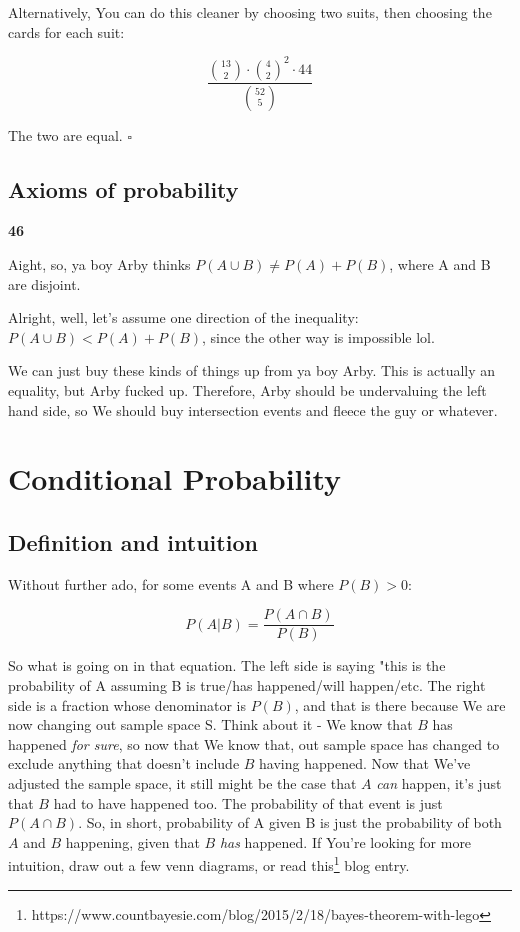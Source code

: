 \documentclass{article}
\newcommand{\qed}{\hfill$\square$}
\begin{document}
			Alternatively, You can do this cleaner by choosing two suits, then choosing the cards for each suit:
			
			$$\frac{\binom{13}{2}\cdot\binom{4}{2}^2\cdot 44}{\binom{52}{5}}$$
			
			The two are equal. \qed
			
			\hfill
			
	\subsection{Axioms of probability}
		
		\textbf{46}
			
			Aight, so, ya boy Arby thinks $P(A \cup B) \neq P(A) + P(B)$, where A and B are disjoint.
			
			Alright, well, let's assume one direction of the inequality: $P(A \cup B) < P(A) + P(B)$, since the other way is impossible lol.
			
			We can just buy these kinds of things up from ya boy Arby.  This is actually an equality, but Arby fucked up. Therefore, Arby should be undervaluing the left hand side, so We should buy intersection events and fleece the guy or whatever. 
			
	\newpage
\section{Conditional Probability}
			
	\subsection{Definition and intuition}
		
		Without further ado, for some events A and B where $P(B) > 0$:
			
		$$ P(A\vert B) = \frac{P(A\cap B)}{P(B)}$$
			
		So what is going on in that equation. The left side is saying "this is the probability of A assuming B is true/has happened/will happen/etc. The right side is a fraction whose denominator is $P(B)$, and that is there because We are now changing out sample space S. Think about it - We know that $B$ has happened \textit{for sure}, so now that We know that, out sample space has changed to exclude anything that doesn't include $B$ having happened. Now that We've adjusted the sample space, it still might be the case that $A$ \textit{can} happen, it's just that $B$ had to have happened too. The probability of that event is just $P(A\cap B)$.
			So, in short, probability of A given B is just the probability of both $A$ and $B$ happening, given that $B$ \textit{has} happened. If You're looking for more intuition, draw out a few venn diagrams, or read this\footnote{https://www.countbayesie.com/blog/2015/2/18/bayes-theorem-with-lego} blog entry.
			
\end{document}
